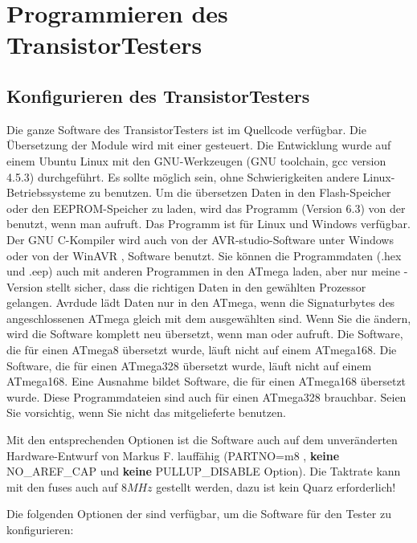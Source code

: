\chapter{Programmieren des TransistorTesters}

\section{Konfigurieren des TransistorTesters}
\label{sec:config}
Die ganze Software des TransistorTesters ist im Quellcode verfügbar.
Die Übersetzung der Module wird mit einer  gesteuert. Die Entwicklung wurde
auf einem Ubuntu Linux mit den GNU-Werkzeugen (GNU toolchain, gcc version 4.5.3) durchgeführt.
Es sollte möglich sein, ohne Schwierigkeiten andere Linux-Betriebssysteme zu benutzen.
Um die übersetzen Daten in den Flash-Speicher oder den EEPROM-Speicher zu laden, wird das
Programm  \cite{avrdude} (Version 6.3) von der  benutzt, wenn man  aufruft.
Das Programm  ist für Linux und Windows verfügbar.
Der GNU C-Kompiler wird auch von der AVR-studio-Software unter Windows oder von
der WinAVR \cite{winavr1},\cite{winavr2} Software benutzt.
Sie können die Programmdaten (.hex und .eep) auch mit anderen Programmen in den ATmega laden,
aber nur meine -Version stellt sicher, dass die richtigen Daten in den gewählten Prozessor gelangen.
Avrdude lädt Daten nur in den ATmega, wenn die Signaturbytes des angeschlossenen ATmega gleich mit dem ausgewählten sind.
Wenn Sie die  ändern, wird die Software komplett neu übersetzt, wenn man  oder
 aufruft.
Die Software, die für einen ATmega8 übersetzt wurde, läuft nicht auf einem ATmega168.
Die Software, die für einen ATmega328 übersetzt wurde, läuft nicht auf einem ATmega168.
Eine Ausnahme bildet Software, die für einen ATmega168 übersetzt wurde. Diese Programmdateien
sind auch für einen ATmega328 brauchbar.
Seien Sie vorsichtig, wenn Sie nicht das mitgelieferte  benutzen.

Mit den entsprechenden Optionen ist die Software auch auf dem unveränderten Hardware-Entwurf von
Markus F. lauffähig (PARTNO=m8 , \textbf{keine} NO\_AREF\_CAP und \textbf{keine} PULLUP\_DISABLE Option).
Die Taktrate kann mit den fuses auch auf \(8MHz\) gestellt werden, dazu ist kein Quarz erforderlich!


Die folgenden Optionen der  sind verfügbar, um die Software für den Tester zu konfigurieren:

